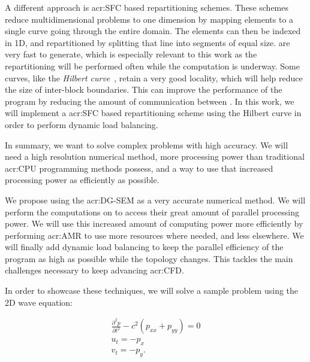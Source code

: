 A different approach is \acrfull{acr:SFC} based repartitioning schemes. These schemes reduce
multidimensional problems to one dimension by mapping elements to a single curve going through the
entire domain\cite{Peano1890}. The elements can then be indexed in 1D, and repartitioned by
splitting that line into segments of equal size.  are very fast to generate,
which is especially relevant to this work as the repartitioning will be performed often while the
computation is underway. Some curves, like the \textit{Hilbert curve}~\cite{Hilbert1891}, retain a
very good locality, which will help reduce the size of inter-block boundaries. This can improve the
performance of the program by reducing the amount of communication between . In
this work, we will implement a \acrshort{acr:SFC} based repartitioning scheme using the Hilbert
curve in order to perform dynamic load balancing.

In summary, we want to solve complex problems with high accuracy. We will need a high resolution
numerical method, more processing power than traditional \acrshort{acr:CPU} programming methods
possess, and a way to use that increased processing power as efficiently as possible. 

We propose using the \acrlong{acr:DG-SEM} as a very accurate numerical method. We will perform the
computations on  to access their great amount of parallel processing power. We
will use this increased amount of computing power more efficiently by performing \acrlong{acr:AMR}
to use more resources where needed, and less elsewhere. We will finally add dynamic load balancing
to keep the parallel efficiency of the program as high as possible while the topology changes. This
tackles the main challenges necessary to keep advancing \acrshort{acr:CFD}.

In order to showcase these techniques, we will solve a sample problem using the 2D wave equation:

\begin{gather}
	\frac{\partial^2p}{\partial t^2} - c^2(p_{xx} + p_{yy}) = 0 \\
	u_t = - p_x \\
	v_t = -p_y.
\end{gather}

